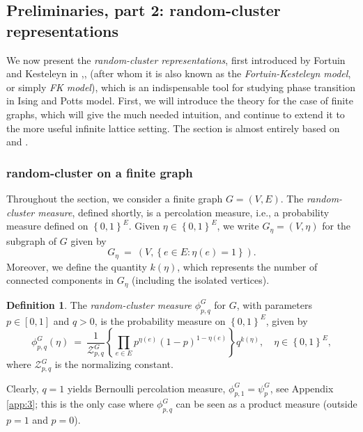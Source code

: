 \documentclass[12pt]{article}
\newcommand{\ZZ}{\mathcal{Z}}
\newcommand{\set}[1]{\left\{#1\right\}}
\newcommand{\1}{\mathbbm{1}}
\newcommand{\5}{\vspace{0.5cm}}
\theoremstyle{definition}
\newtheorem{df}[thm]{Definition}
\begin{document}

\subsection{Preliminaries, part 2: random-cluster representations}\label{sec:RandomCluster}

We now present the \textit{random-cluster representations}, first introduced by Fortuin and Kesteleyn in \cite{FK},\cite{For1},\cite{For2} (after whom it is also known as the \textit{Fortuin-Kesteleyn model}, or simply \textit{FK model}), which is an indispensable tool for studying phase transition in Ising and Potts model. First, we will introduce the theory for the case of finite graphs, which will give the much needed intuition, and continue to extend it to the more useful infinite lattice setting. The section is almost entirely based on \cite{GHM} and \cite{Gri}.


\subsubsection{random-cluster on a finite graph}

Throughout the section, we consider a finite graph $G=(V,E)$. The \textit{random-cluster measure}, defined shortly, is a percolation measure, i.e., a probability measure defined on $\set{0,1}^E$. Given $\eta\in\set{0,1}^E$, we write $G_\eta=(V,\eta)$ for the subgraph of $G$ given by 
$$G_\eta ~=~ (V,\set{e\in E:\eta(e)=1}).$$
Moreover, we define the quantity $k(\eta)$, which represents the number of connected components in $G_\eta$ (including the isolated vertices). 

\begin{df}
The \textit{random-cluster measure} $\phi_{p,q}^G$ for $G$, with parameters $p\in[0,1]$ and $q>0$, is the probability measure on $\set{0,1}^E$, given by
$$\phi_{p,q}^{G}(\eta) ~=~ \frac{1}{\ZZ_{p,q}^G}\set{\prod_{e\in E}p^{\eta(e)}(1-p)^{1-\eta(e)}}q^{k(\eta)}, \quad \eta\in\set{0,1}^E,$$
where $\ZZ_{p,q}^{G}$ is the normalizing constant.
\end{df} 

Clearly, $q=1$ yields Bernoulli percolation measure, $\phi_{p,1}^G=\psi_{p}^G$, see Appendix \ref{app:3}; this is the only case where $\phi_{p,q}^G$ can be seen as a product measure (outside $p=1$ and $p=0$). \\
\end{document}
